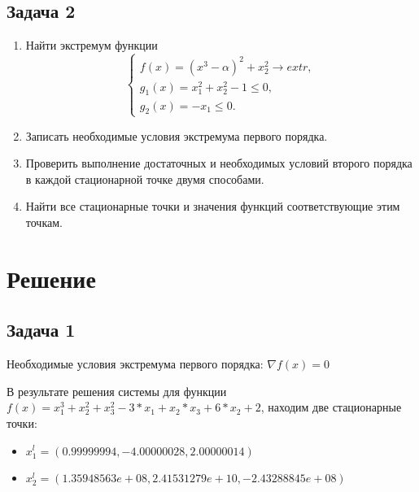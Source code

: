 \documentclass[12pt,a4paper,oneside]{extarticle}
\begin{document}
    \subsection {Задача 2}
        \begin{enumerate}
            \item Найти экстремум функции
            \begin{equation*}
                \begin{cases}
                   f(x) = (x^3 - \alpha)^2 + x_2^2 \rightarrow extr, \\
                   g_1(x) = x_1^2+x_2^2 - 1 \le 0, \\
                   g_2(x) = -x_1 \le 0.
                \end{cases}
            \end{equation*}
            \item Записать необходимые условия экстремума первого порядка.
            \item Проверить выполнение достаточных и необходимых условий второго порядка в каждой стационарной точке двумя способами.
            \item Найти все стационарные точки и значения функций соответствующие этим точкам.
        \end{enumerate}
\section{Решение}
    \subsection {Задача 1}
        Необходимые условия экстремума первого порядка:
        $\nabla f(x) = 0$

        В результате решения системы для функции $f(x) = x_1^3 + x_2^2 + x_3^2 - 3*x_1 + x_2*x_3 + 6*x_2 + 2$, находим две стационарные точки:
        \begin{itemize}
            \item $x^l_1 = (0.99999994, -4.00000028,  2.00000014)$
            \item $x^l_2 = (1.35948563e+08,   2.41531279e+10,  -2.43288845e+08)$
        \end{itemize}

        
\end{document}
